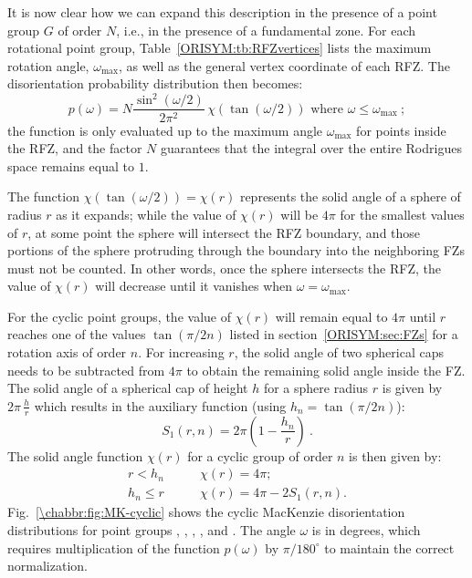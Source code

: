 It is now clear how we can expand this description in the presence of a point group $G$ of order $N$, i.e., in the presence of a fundamental zone.  For each rotational point group, Table~\ref{ORISYM:tb:RFZvertices} lists the maximum rotation angle, $\omega_\text{max}$, as well as the general vertex coordinate of each RFZ.  The disorientation probability distribution then becomes:
\begin{equation}
	p(\omega) = N \frac{\sin^2(\omega/2)}{2\pi^2}\,\chi(\tan(\omega/2))\text{ where }\omega\le\omega_\text{max}\ ;
\end{equation}
the function is only evaluated up to the maximum angle $\omega_\text{max}$ for points inside the RFZ, and the factor $N$ guarantees that the integral over the entire Rodrigues space remains equal to $1$.

The function $\chi(\tan(\omega/2))=\chi(r)$ represents the solid angle of a sphere of radius $r$ as it expands; while the value of $\chi(r)$ will be  $4\pi$ for the smallest values of $r$, at some point the sphere will intersect the RFZ boundary, and those portions of the sphere protruding through the boundary into the neighboring FZs must not be counted.  In other words, once the sphere intersects the RFZ, the value of $\chi(r)$ will decrease until it vanishes when $\omega=\omega_\text{max}$.  

For the cyclic point groups, the value of $\chi(r)$ will remain equal to $4\pi$ until $r$ reaches one of the values $\tan(\pi/2n)$ listed in section~\ref{ORISYM:sec:FZs} for a rotation axis of order $n$.  For increasing $r$, the solid angle of two spherical caps needs to be subtracted from $4\pi$ to obtain the remaining solid angle inside the FZ.  The solid angle of a spherical cap of height $h$ for a sphere radius $r$ is given by $2\pi\,\frac{h}{r}$ which results in the auxiliary function (using $h_n=\tan(\pi/2n)$):
\[
	S_1(r,n) =  2\pi\left(1-\frac{h_n}{r}\right)\ .
\]
The solid angle function $\chi(r)$ for a cyclic group of order $n$ is then given by:
\begin{equation}
\begin{split}
	r<h_n &\qquad \chi(r) =  4\pi;\\
	h_n\le r &\qquad \chi(r) = 4\pi-2S_1(r,n)\label{\chabbr:eq:probcyclic} .
\end{split}
\end{equation}
Fig.~\ref{\chabbr:fig:MK-cyclic} shows the cyclic MacKenzie disorientation distributions for point groups , , , , and . The angle $\omega$ is in degrees, which requires multiplication of the function $p(\omega)$ by $\pi/180^{\circ}$ to maintain the correct normalization.

